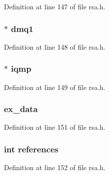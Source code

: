 Definition at line 147 of file rsa.\+h.

\subsubsection[{\texorpdfstring{dmq1}{dmq1}}]{ $\ast$ dmq1}\hypertarget{structrsa__st_a346288c4353d26f1e972761f1859b1f9}{}\label{structrsa__st_a346288c4353d26f1e972761f1859b1f9}


Definition at line 148 of file rsa.\+h.

\subsubsection[{\texorpdfstring{iqmp}{iqmp}}]{ $\ast$ iqmp}\hypertarget{structrsa__st_a105805877380f26c779af6dc8f08da7f}{}\label{structrsa__st_a105805877380f26c779af6dc8f08da7f}


Definition at line 149 of file rsa.\+h.

\subsubsection[{\texorpdfstring{ex\+\_\+data}{ex_data}}]{ ex\+\_\+data}\hypertarget{structrsa__st_ac3e4fd59d6ee44a81f3a58114613c1e2}{}\label{structrsa__st_ac3e4fd59d6ee44a81f3a58114613c1e2}


Definition at line 151 of file rsa.\+h.

\subsubsection[{\texorpdfstring{references}{references}}]{\setlength{\rightskip}{0pt plus 5cm}int references}\hypertarget{structrsa__st_a146fdb34d9a909e530adf8b189481195}{}\label{structrsa__st_a146fdb34d9a909e530adf8b189481195}


Definition at line 152 of file rsa.\+h.

